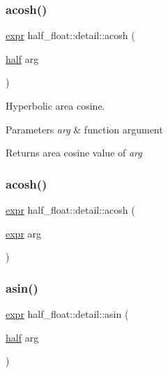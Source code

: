 \subsubsection{\texorpdfstring{acosh()}{acosh()}\hspace{0.1cm}{\footnotesize\ttfamily [1/2]}}
{\footnotesize\ttfamily \hyperlink{structhalf__float_1_1detail_1_1expr}{expr} half\+\_\+float\+::detail\+::acosh (\begin{DoxyParamCaption}\item[{\hyperlink{classhalf__float_1_1half}{half}}]{arg }\end{DoxyParamCaption})\hspace{0.3cm}{\ttfamily [inline]}}

Hyperbolic area cosine. 
\begin{DoxyParams}{Parameters}
{\em arg} & function argument \\
\hline
\end{DoxyParams}
\begin{DoxyReturn}{Returns}
area cosine value of {\itshape arg} 
\end{DoxyReturn}
\mbox{\label{namespacehalf__float_1_1detail_a770438bb92d31e565c573ec6c2018809}} 
\subsubsection{\texorpdfstring{acosh()}{acosh()}\hspace{0.1cm}{\footnotesize\ttfamily [2/2]}}
{\footnotesize\ttfamily \hyperlink{structhalf__float_1_1detail_1_1expr}{expr} half\+\_\+float\+::detail\+::acosh (\begin{DoxyParamCaption}\item[{\hyperlink{structhalf__float_1_1detail_1_1expr}{expr}}]{arg }\end{DoxyParamCaption})\hspace{0.3cm}{\ttfamily [inline]}}

\mbox{\label{namespacehalf__float_1_1detail_ad93b1ac42816b8519b0653f58f327ba5}} 
\subsubsection{\texorpdfstring{asin()}{asin()}\hspace{0.1cm}{\footnotesize\ttfamily [1/2]}}
{\footnotesize\ttfamily \hyperlink{structhalf__float_1_1detail_1_1expr}{expr} half\+\_\+float\+::detail\+::asin (\begin{DoxyParamCaption}\item[{\hyperlink{classhalf__float_1_1half}{half}}]{arg }\end{DoxyParamCaption})\hspace{0.3cm}{\ttfamily [inline]}}

